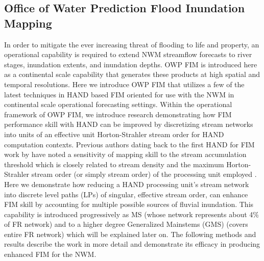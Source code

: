 \subsection{Office of Water Prediction Flood Inundation Mapping}
%
In order to mitigate the ever increasing threat of flooding to life and property, an operational capability is required to extend NWM streamflow forecasts to river stages, inundation extents, and inundation depths.
OWP FIM is introduced here as a continental scale capability that generates these products at high spatial and temporal resolutions.
Here we introduce OWP FIM that utilizes a few of the latest techniques in HAND based FIM oriented for use with the NWM in continental scale operational forecasting settings. 
Within the operational framework of OWP FIM, we introduce research demonstrating how FIM performance skill with HAND can be improved by discretizing stream networks into units of an effective unit Horton-Strahler stream order \cite{horton1945erosional,strahler1952hypsometric,strahler1952hypsometric} for HAND computation contexts.
Previous authors dating back to the first HAND for FIM work by  have noted a sensitivity of mapping skill to the stream accumulation threshold which is closely related to stream density and the maximum Horton-Strahler stream order (or simply stream order) of the processing unit employed \cite{zhang2018comparative,mcgehee2016modified,li2020evaluation}.
Here we demonstrate how reducing a HAND processing unit's stream network into discrete level paths (LPs) of singular, effective stream order, can enhance FIM skill by accounting for multiple possible sources of fluvial inundation.
This capability is introduced progressively as MS (whose network represents about 4\% of FR network) and to a higher degree Generalized Mainstems (GMS) (covers entire FR network) which will be explained later on.
The following methods and results describe the work in more detail and demonstrate its efficacy in producing enhanced FIM for the NWM.
%
